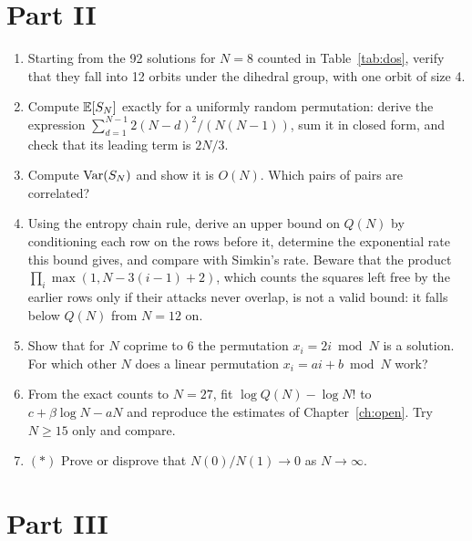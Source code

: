 \section*{Part II}

\begin{enumerate}
\item Starting from the 92 solutions for $N = 8$ counted in Table~\ref{tab:dos}, verify that they fall into 12 orbits under the dihedral group, with one orbit of size 4.

\item Compute $\mathbb{E}[S_N]$ exactly for a uniformly random permutation: derive the expression $\sum_{d=1}^{N-1} 2(N-d)^2 / (N(N-1))$, sum it in closed form, and check that its leading term is $2N/3$.

\item Compute $\operatorname{Var}(S_N)$ and show it is $O(N)$. Which pairs of pairs are correlated?

\item Using the entropy chain rule, derive an upper bound on $Q(N)$ by conditioning each row on the rows before it, determine the exponential rate this bound gives, and compare with Simkin's rate. Beware that the product $\prod_i \max(1, N - 3(i-1) + 2)$, which counts the squares left free by the earlier rows only if their attacks never overlap, is not a valid bound: it falls below $Q(N)$ from $N = 12$ on.

\item Show that for $N$ coprime to $6$ the permutation $x_i = 2i \bmod N$ is a solution. For which other $N$ does a linear permutation $x_i = ai + b \bmod N$ work?

\item From the exact counts to $N = 27$, fit $\log Q(N) - \log N!$ to $c + \beta \log N - aN$ and reproduce the estimates of Chapter~\ref{ch:open}. Try $N \ge 15$ only and compare.

\item $(*)$ Prove or disprove that $N(0)/N(1) \to 0$ as $N \to \infty$.
\end{enumerate}

\section*{Part III}

